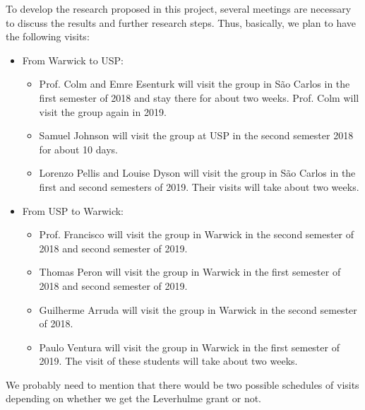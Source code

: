 To develop the research proposed in this project, several meetings are 
necessary to discuss the results and further research steps. Thus, basically, 
we plan to have the following visits:
\begin{itemize}
\item From Warwick to USP:
\begin{itemize}
\item Prof. Colm  and Emre Esenturk will visit the group in S\~{a}o Carlos in 
the first semester of 2018 and stay there for about two weeks. Prof. Colm will 
visit the group again in 2019.
\item Samuel Johnson will visit the group at USP in the second semester 2018 
for about 10 days.
\item Lorenzo Pellis and Louise Dyson will visit the group in S\~{a}o Carlos in 
the first and second semesters of 2019. Their visits will take about two weeks.
\end{itemize}

\item From USP to Warwick:
\begin{itemize}
\item Prof. Francisco will visit the group in Warwick in the second semester of 
2018 and second semester of 2019.
\item Thomas Peron will visit the group in Warwick in the first semester of 
2018 and second semester of 2019.
\item Guilherme Arruda will visit the group in Warwick in the second semester 
of 2018.
\item Paulo Ventura will visit the group in Warwick in the first semester of 
2019. The visit of these students will take about two weeks.
\end{itemize}
\end{itemize}

{\color{red}We probably need to mention that there would be two possible 
schedules of visits depending on whether we get the Leverhulme grant or not.}
